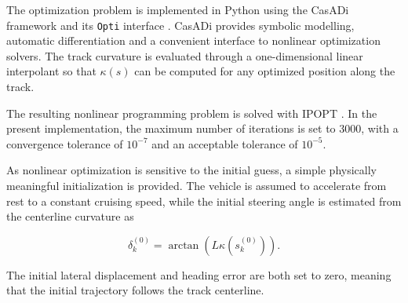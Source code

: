 The optimization problem is implemented in Python using the CasADi framework and its \texttt{Opti} interface \cite{andersson2019casadi}. CasADi provides symbolic modelling, automatic differentiation and a convenient interface to nonlinear optimization solvers. The track curvature is evaluated through a one-dimensional linear interpolant so that \(\kappa(s)\) can be computed for any optimized position along the track.

The resulting nonlinear programming problem is solved with IPOPT \cite{wachter2006ipopt}. In the present implementation, the maximum number of iterations is set to 3000, with a convergence tolerance of \(10^{-7}\) and an acceptable tolerance of \(10^{-5}\).

As nonlinear optimization is sensitive to the initial guess, a simple physically meaningful initialization is provided. The vehicle is assumed to accelerate from rest to a constant cruising speed, while the initial steering angle is estimated from the centerline curvature as

\begin{equation}
    \delta_k^{(0)}
    =
    \arctan\left(L\kappa(s_k^{(0)})\right).
\end{equation}

The initial lateral displacement and heading error are both set to zero, meaning that the initial trajectory follows the track centerline.